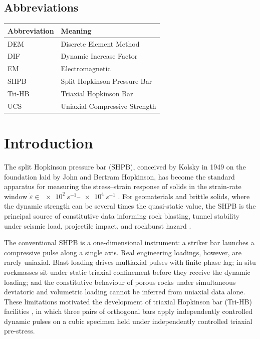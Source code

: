 \documentclass[11pt,a4paper,openany]{book}
\providecommand{\SIrange}[3]{\qtyrange{#1}{#2}{#3}}
\theoremstyle{handbook}
\newcommand{\eps}{\varepsilon}
\newcommand{\epsdot}{\dot\eps}
\begin{document}
\section*{Abbreviations}
\begingroup
\setlength{\parskip}{0pt}
\begin{tabular}{@{}p{3cm}p{12cm}@{}}
\toprule
\textbf{Abbreviation} & \textbf{Meaning} \\
\midrule
DEM & Discrete Element Method \\
DIF & Dynamic Increase Factor \\
EM & Electromagnetic \\
SHPB & Split Hopkinson Pressure Bar \\
Tri-HB & Triaxial Hopkinson Bar \\
UCS & Uniaxial Compressive Strength \\
\bottomrule
\end{tabular}
\endgroup


\mainmatter

\chapter{Introduction}\label{ch:intro}

The split Hopkinson pressure bar (SHPB), conceived by Kolsky in 1949
\cite{Kolsky1949} on the foundation laid by John and Bertram Hopkinson, has
become the standard apparatus for measuring the stress--strain response of
solids in the strain-rate window
$\epsdot \in \SIrange{e2}{e4}{s^{-1}}$ \cite{Lindholm1964,FollansbeeFrantz1983}.
For geomaterials and brittle solids, where the dynamic strength can be several
times the quasi-static value, the SHPB is the principal source of
constitutive data informing rock blasting, tunnel stability under seismic load,
projectile impact, and rockburst hazard \cite{ZhangZhao2014,WangZhang2026}.

The conventional SHPB is a one-dimensional instrument: a striker bar launches
a compressive pulse along a single axis. Real engineering loadings, however,
are rarely uniaxial. Blast loading drives multiaxial pulses with finite
phase lag; in-situ rockmasses sit under static triaxial confinement before
they receive the dynamic loading; and the constitutive behaviour of porous
rocks under simultaneous deviatoric and volumetric loading cannot be inferred
from uniaxial data alone. These limitations motivated the development of
triaxial Hopkinson bar (Tri-HB) facilities \cite{Liu2019,Zhang2019Tri},
in which three pairs of orthogonal bars apply independently controlled dynamic
pulses on a cubic specimen held under independently controlled triaxial
pre-stress.
\end{document}
